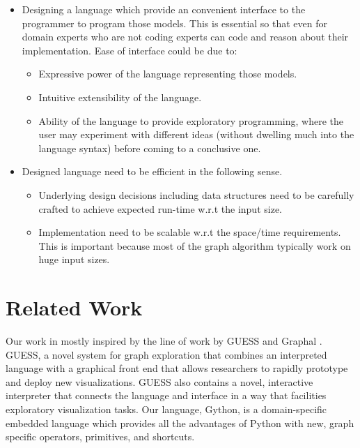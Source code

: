 \documentclass[letterpaper]{sig-alternate} \special{papersize=8.5in,11in}
\begin{document}
    \begin{itemize} \item Designing a language which provide an convenient
    interface to the programmer to program those models.  This is essential so
    that even for domain experts who are not coding experts can code and reason
    about their implementation.  Ease of interface could be due to:
    \begin{itemize} \item Expressive power of the language representing those
    models.  \item Intuitive extensibility of the language.  \item Ability of
    the language to provide exploratory programming, where the user may
    experiment with different ideas (without dwelling much into the language
        syntax) before coming to a conclusive one.  \end{itemize} \item
    Designed language need to be efficient in the following sense.
    \begin{itemize} \item Underlying design decisions including data structures
    need to be carefully crafted to achieve expected run-time w.r.t the input
    size.  \item Implementation need to be scalable w.r.t the space/time
    requirements. This is important because most of the graph algorithm
    typically work on huge input sizes.  \end{itemize} \end{itemize}       


\section{Related Work}\label{sec:bgrel}
Our work in mostly inspired by the line of work by GUESS \cite{Adar} and
Graphal \cite{Graphal}.
GUESS, a novel system for graph
exploration that combines an interpreted language with a
graphical front end that allows researchers to rapidly prototype
and deploy new visualizations. GUESS also contains a novel,
interactive interpreter that connects the language and interface in
a way that facilities exploratory visualization tasks. Our
language, Gython, is a domain-specific embedded language
which provides all the advantages of Python with new, graph
specific operators, primitives, and shortcuts.
\end{document}
